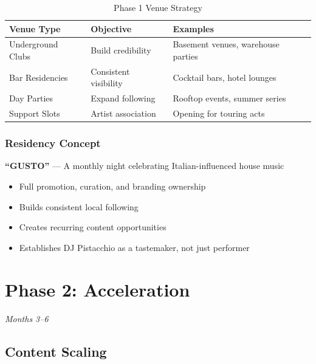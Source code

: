 \documentclass[11pt,a4paper]{article}
\begin{document}
\begin{table}[h!]
\centering
\renewcommand{\arraystretch}{1.3}
\begin{tabularx}{\textwidth}{l l X}
\toprule
\rowcolor{amaraprimary}
\textcolor{amaracream}{\textbf{Venue Type}} & \textcolor{amaracream}{\textbf{Objective}} & \textcolor{amaracream}{\textbf{Examples}} \\
\midrule
Underground Clubs & Build credibility & Basement venues, warehouse parties \\
Bar Residencies & Consistent visibility & Cocktail bars, hotel lounges \\
Day Parties & Expand following & Rooftop events, summer series \\
Support Slots & Artist association & Opening for touring acts \\
\bottomrule
\end{tabularx}
\caption{Phase 1 Venue Strategy}
\end{table}

\subsubsection{Residency Concept}

\begin{highlightbox}
\textbf{``GUSTO''} --- A monthly night celebrating Italian-influenced house music
\begin{itemize}[leftmargin=*,topsep=0pt]
    \item Full promotion, curation, and branding ownership
    \item Builds consistent local following
    \item Creates recurring content opportunities
    \item Establishes DJ Pistacchio as a tastemaker, not just performer
\end{itemize}
\end{highlightbox}

\newpage
\section{Phase 2: Acceleration}
\textit{Months 3--6}

\subsection{Content Scaling}
\end{document}
